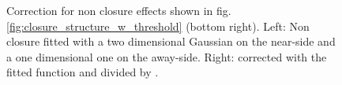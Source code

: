 \begin{figure}
\begin{subfigure}{0.5\textwidth}
  \end{subfigure}
  \caption[Alternative correction method based on the non-closure effects.]{Correction for non closure effects shown in fig. \ref{fig:closure_structure_w_threshold} (bottom right). Left: Non closure fitted with a two dimensional Gaussian on the \gls{near-side} and a one dimensional one on the \gls{away-side}. Right: \Yrecon corrected with the fitted function and divided by \Ytruth. }
  \label{fig:fake_mc_closure_test}
\end{figure}


